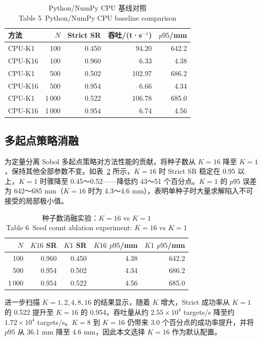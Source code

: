 \documentclass[twocolumn,a4paper,10pt]{ctexart}
\begin{document}
\begin{table}[htbp]
\centering
\caption{Python/NumPy CPU 基线对照\\[2pt] {\small Table 5~Python/NumPy CPU baseline comparison}}
\label{tab:cpu}
\scriptsize
\setlength{\tabcolsep}{3pt}
\begin{tabular}{lrrrr}
\toprule
方法 & $N$ & Strict SR & 吞吐/(t·s$^{-1}$) & $p95$/mm\\
\midrule
CPU-K1  & 100  & 0.450 & 94.20  & 642.2\\
CPU-K16 & 100  & 0.960 & 6.33   & 4.38\\
CPU-K1  & 500  & 0.502 & 102.97 & 686.2\\
CPU-K16 & 500  & 0.954 & 6.66   & 4.34\\
CPU-K1  & 1\,000 & 0.522 & 106.78 & 685.0\\
CPU-K16 & 1\,000 & 0.954 & 6.74   & 4.56\\
\bottomrule
\end{tabular}
\end{table}

\subsection{多起点策略消融}

为定量分离 Sobol 多起点策略对方法性能的贡献，将种子数从 $K=16$ 降至 $K=1$，保持其他全部参数不变。如表~\ref{tab:ablation} 所示，$K=16$ 时 Strict SR 稳定在 0.95 以上，$K=1$ 时骤降至 0.45～0.52——降低约 43～51 个百分点。$K=1$ 的 $p95$ 误差为 642～685 mm（$K=16$ 时为 4.3～4.6 mm），表明单种子时大量求解陷入不可接受的局部极小值。

\begin{table}[htbp]
\centering
\caption{种子数消融实验：$K=16$ vs $K=1$\\[2pt] {\small Table 6~Seed count ablation experiment: $K=16$ vs $K=1$}}
\label{tab:ablation}
\scriptsize
\setlength{\tabcolsep}{3pt}
\begin{tabular}{rrrrr}
\toprule
$N$ & $K16$ SR & $K1$ SR & $K16$ $p95$/mm & $K1$ $p95$/mm\\
\midrule
100  & 0.960 & 0.450 & 4.38  & 642.2\\
500  & 0.954 & 0.502 & 4.34  & 686.2\\
1\,000 & 0.954 & 0.522 & 4.56  & 685.0\\
\bottomrule
\end{tabular}
\end{table}

进一步扫描 $K=1,2,4,8,16$ 的结果显示，随着 $K$ 增大，Strict 成功率从 $K=1$ 的 0.522 提升至 $K=16$ 的 0.954，吞吐量从约 $2.55\times10^4$ targets/s 降至约 $1.72\times10^4$ targets/s。$K=8$ 到 $K=16$ 仍带来 3.0 个百分点的成功率提升，并将 $p95$ 从 36.1 mm 降至 4.6 mm，因此本文选择 $K=16$ 作为默认配置。
\end{document}
